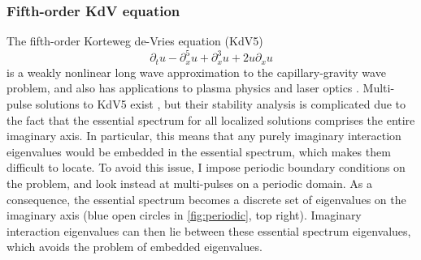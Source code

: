 \documentclass[11pt,reqno,oneside]{article}
\theoremstyle{definition}
\theoremstyle{remark}
\begin{document}
\subsubsection*{Fifth-order KdV equation}

The fifth-order Korteweg de-Vries equation (KdV5) 
\[
\partial_t u - \partial_x^5 u + \partial_x^3 u + 2 u \partial_x u
\]
is a weakly nonlinear long wave approximation to the capillary-gravity wave problem, and also has applications to plasma physics and laser optics \cite{Pelinovsky2007}. Multi-pulse solutions to KdV5 exist \cite{SandstedeStrut}, but their stability analysis is complicated due to the fact that the essential spectrum for all localized solutions comprises the entire imaginary axis. In particular, this means that any purely imaginary interaction eigenvalues would be embedded in the essential spectrum, which makes them difficult to locate. To avoid this issue, I impose periodic boundary conditions on the problem, and look instead at multi-pulses on a periodic domain. As a consequence, the essential spectrum becomes a discrete set of eigenvalues on the imaginary axis (blue open circles in \cref{fig:periodic}, top right). Imaginary interaction eigenvalues can then lie between these essential spectrum eigenvalues, which avoids the problem of embedded eigenvalues. 
\end{document}
